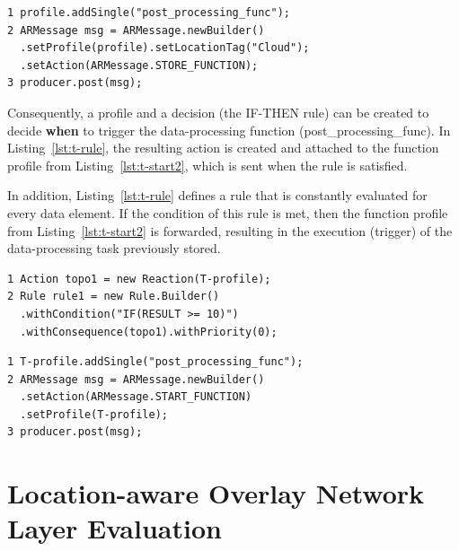 \begin{lstlisting}[language=mylang, caption={Store post-processing task in the R-Pulsar overlay network.}, captionpos=b, label={lst:ed2}]
1 profile.addSingle("post_processing_func");
2 ARMessage msg = ARMessage.newBuilder()
  .setProfile(profile).setLocationTag("Cloud");
  .setAction(ARMessage.STORE_FUNCTION);
3 producer.post(msg);
\end{lstlisting}

Consequently, a profile and a decision (the IF-THEN rule) can be created to decide \textbf{when} to trigger the data-processing function (post\_processing\_func). In Listing~\ref{lst:t-rule}, the resulting action is created and attached to the function profile from Listing~\ref{lst:t-start2}, which is sent when the rule is satisfied.

In addition, Listing~\ref{lst:t-rule} defines a rule that is constantly evaluated for every data element. If the condition of this rule is met, then the function profile from Listing~\ref{lst:t-start2} is forwarded, resulting in the execution (trigger) of the data-processing task previously stored.

\begin{lstlisting}[language=mylang, caption={Rule based programming abstraction for deploying the post-processing task.}, captionpos=b, label={lst:t-rule}]
1 Action topo1 = new Reaction(T-profile);
2 Rule rule1 = new Rule.Builder()
  .withCondition("IF(RESULT >= 10)")
  .withConsequence(topo1).withPriority(0);
\end{lstlisting}

\begin{lstlisting}[language=mylang, caption={Profile for deploying the post-processing task.}, captionpos=b, label={lst:t-start2}]
1 T-profile.addSingle("post_processing_func");
2 ARMessage msg = ARMessage.newBuilder()
  .setAction(ARMessage.START_FUNCTION)
  .setProfile(T-profile);
3 producer.post(msg);
\end{lstlisting}

\section{Location-aware Overlay Network Layer Evaluation}


